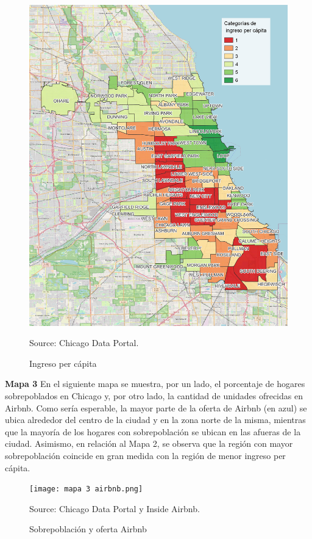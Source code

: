 \documentclass[11pt]{article}
\newcommand{\source}[1]{\caption*{Source: {#1}} }
\begin{document}
\begin{figure}[H]
    \centering
    \caption{Ingreso per cápita}
    \includegraphics[scale=0.6]{mapa 2 airbnb.png}
    \source{Chicago Data Portal.}
    \label{fig:2}
\end{figure}


\newpage
\textbf{Mapa 3} En el siguiente mapa se muestra, por un lado, el porcentaje de hogares sobrepoblados en Chicago y, por otro lado, la cantidad de unidades ofrecidas en Airbnb. Como sería esperable, la mayor parte de la oferta de Airbnb (en azul) se ubica alrededor del centro de la ciudad y en la zona norte de la misma, mientras que la mayoría de los hogares con sobrepoblación se ubican en las afueras de la ciudad. Asimismo, en relación al Mapa 2, se observa que la región con mayor sobrepoblación coincide en gran medida con la región de menor ingreso per cápita. 


\begin{figure}[H]
    \centering
    \caption{Sobrepoblación y oferta Airbnb}
    \texttt{[image: mapa 3 airbnb.png]}
    \source{Chicago Data Portal y Inside Airbnb.}
    \label{fig:3}
\end{figure}
\end{document}
